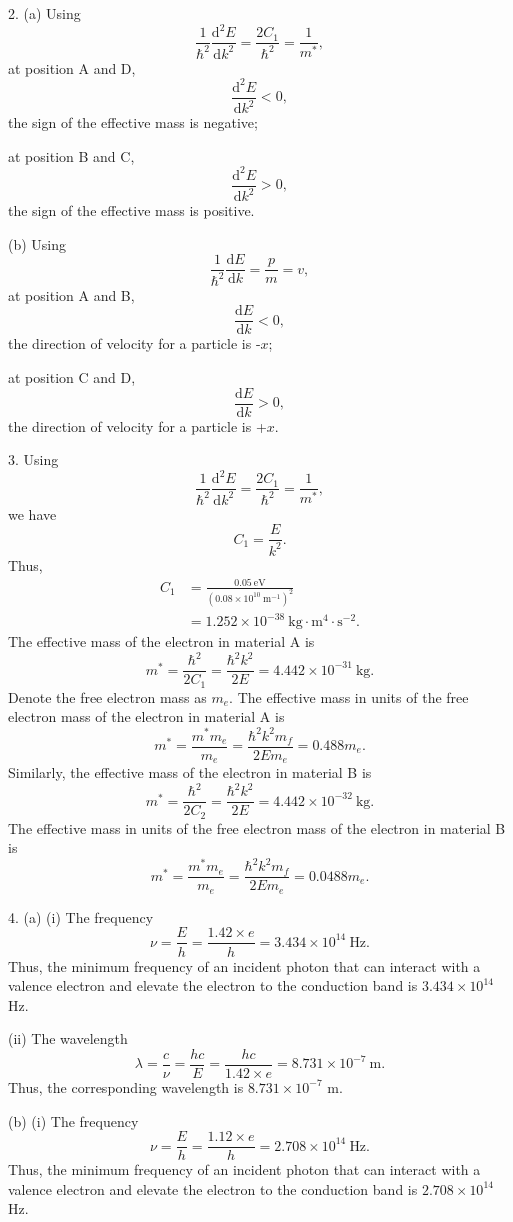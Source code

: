 \documentclass[a4paper,x11names]{article}
\begin{document}
2. (a) Using
$$\frac{1}{\hbar^2}\frac{\mathrm{d}^2E}{\mathrm{d}k^2}=\frac{2C_1}{\hbar^2}=\frac{1}{m^*},$$
at position A and D,
$$\frac{\mathrm{d}^2E}{\mathrm{d}k^2}<0,$$
the sign of the effective mass is negative;

at position B and C,
$$\frac{\mathrm{d}^2E}{\mathrm{d}k^2}>0,$$
the sign of the effective mass is positive.

(b) Using
$$\frac{1}{\hbar^2}\frac{\mathrm{d}E}{\mathrm{d}k}=\frac{p}{m}=v,$$
at position A and B,
$$\frac{\mathrm{d}E}{\mathrm{d}k}<0,$$
the direction of velocity for a particle is -$x$;

at position C and D,
$$\frac{\mathrm{d}E}{\mathrm{d}k}>0,$$
the direction of velocity for a particle is +$x$.

3. Using
$$\frac{1}{\hbar^2}\frac{\mathrm{d}^2E}{\mathrm{d}k^2}=\frac{2C_1}{\hbar^2}=\frac{1}{m^*},$$
we have
$$C_1=\frac{E}{k^2}.$$
Thus,
$$
\begin{aligned}
    C_1&=\frac{0.05\ \text{eV}}{(0.08\times10^{10}\ \text{m}^{-1})^2}\\
    &=1.252\times10^{-38}\ \text{kg}\cdot\text{m}^4\cdot\text{s}^{-2}.
\end{aligned}
$$
The effective mass of the electron in material A is
$$m^*=\frac{\hbar^2}{2C_1}=\frac{\hbar^2k^2}{2E}=4.442\times10^{-31}\ \text{kg}.$$
Denote the free electron mass as $m_e$. The effective mass in units of the free electron mass of the electron in material A is
$$m^*=\frac{m^*m_e}{m_e}=\frac{\hbar^2k^2m_f}{2Em_e}=0.488m_e.$$
Similarly, the effective mass of the electron in material B is
$$m^*=\frac{\hbar^2}{2C_2}=\frac{\hbar^2k^2}{2E}=4.442\times10^{-32}\ \text{kg}.$$
The effective mass in units of the free electron mass of the electron in material B is
$$m^*=\frac{m^*m_e}{m_e}=\frac{\hbar^2k^2m_f}{2Em_e}=0.0488m_e.$$

4. (a) (i) The frequency
$$\nu=\frac{E}{h}=\frac{1.42\times e}{h}=3.434\times10^{14}\ \text{Hz}.$$
Thus, the minimum frequency of an incident photon that can interact with a valence electron and elevate the electron to the conduction band is $3.434\times10^{14}$ Hz.

(ii) The wavelength
$$\lambda=\frac{c}{\nu}=\frac{hc}{E}=\frac{hc}{1.42\times e}=8.731\times10^{-7}\ \text{m}.$$
Thus, the corresponding wavelength is $8.731\times10^{-7}$ m.

(b) (i) The frequency
$$\nu=\frac{E}{h}=\frac{1.12\times e}{h}=2.708\times10^{14}\ \text{Hz}.$$
Thus, the minimum frequency of an incident photon that can interact with a valence electron and elevate the electron to the conduction band is $2.708\times10^{14}$ Hz.
\end{document}
